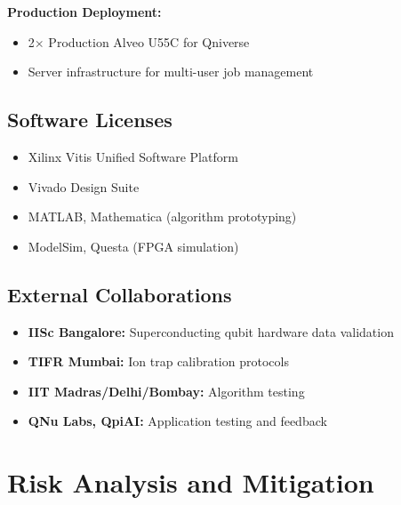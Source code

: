 \documentclass[12pt,a4paper]{article}
\begin{document}
\textbf{Production Deployment:}
\begin{itemize}[noitemsep]
    \item 2$\times$ Production Alveo U55C for Qniverse
    \item Server infrastructure for multi-user job management
\end{itemize}

\subsection{Software Licenses}
\begin{itemize}[noitemsep]
    \item Xilinx Vitis Unified Software Platform
    \item Vivado Design Suite
    \item MATLAB, Mathematica (algorithm prototyping)
    \item ModelSim, Questa (FPGA simulation)
\end{itemize}

\subsection{External Collaborations}
\begin{itemize}[noitemsep]
    \item \textbf{IISc Bangalore:} Superconducting qubit hardware data validation
    \item \textbf{TIFR Mumbai:} Ion trap calibration protocols
    \item \textbf{IIT Madras/Delhi/Bombay:} Algorithm testing
    \item \textbf{QNu Labs, QpiAI:} Application testing and feedback
\end{itemize}

\newpage
\section{Risk Analysis and Mitigation}
\end{document}
